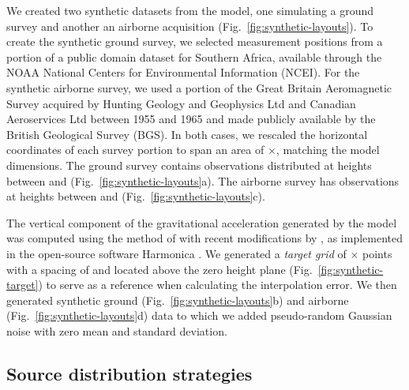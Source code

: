 We created two synthetic datasets from the model, one simulating a ground
survey and another an airborne acquisition (Fig.~\ref{fig:synthetic-layouts}).
To create the synthetic ground survey, we selected measurement positions from a
portion of a public domain dataset for Southern Africa, available through the
NOAA National Centers for Environmental Information (NCEI).
For the synthetic airborne survey, we used a portion of the Great Britain
Aeromagnetic Survey acquired by Hunting Geology and Geophysics Ltd and Canadian
Aeroservices Ltd between 1955 and 1965 and made publicly available by the
British Geological Survey (BGS).
In both cases, we rescaled the horizontal coordinates of each survey portion to
span an area of \SurveyEasting{}$\times$\SurveyNorthing{}, matching the model
dimensions.
The ground survey contains \GroundSurveyPoints{} observations distributed at
heights between \GroundSurveyMinHeight{} and \GroundSurveyMaxHeight{}
(Fig.~\ref{fig:synthetic-layouts}a).
The airborne survey has \AirborneSurveyPoints{} observations at heights between
\AirborneSurveyMinHeight{} and \AirborneSurveyMaxHeight{}
(Fig.~\ref{fig:synthetic-layouts}c).

The vertical component of the gravitational acceleration generated by the
model was computed  using the method of \citet{nagy2000, nagy2002}
with recent modifications by \citet{fukushima2020},
as implemented in the open-source software Harmonica \citep{harmonica2020}.
We generated a \emph{target grid} of
\TargetEastingSize{}$\times$\TargetNorthingSize{} points with a spacing of
\TargetSpacing{} and located \TargetHeight{} above the zero height plane
(Fig.~\ref{fig:synthetic-target}) to serve as a reference when calculating the
interpolation error.
We then generated synthetic ground (Fig.~\ref{fig:synthetic-layouts}b) and
airborne (Fig.~\ref{fig:synthetic-layouts}d) data to which we added
pseudo-random Gaussian noise with zero mean and \SurveyNoise{} standard
deviation.


\subsection{Source distribution strategies}
\label{sec:synthetic_distributions}

